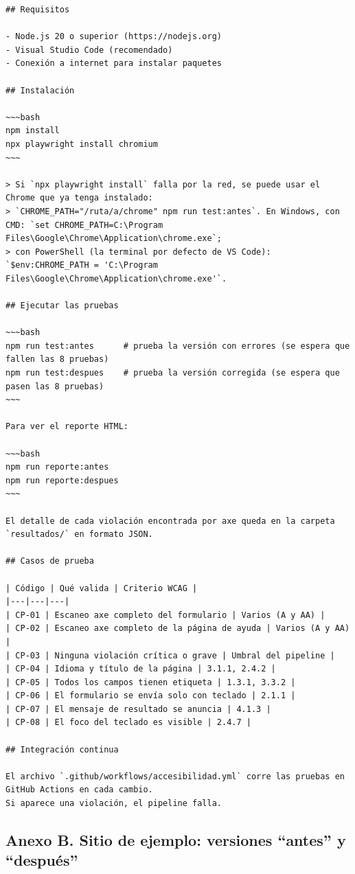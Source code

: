 \documentclass[10pt,letterpaper,onecolumn]{IEEEtran}
\begin{document}
\begin{lstlisting}
## Requisitos

- Node.js 20 o superior (https://nodejs.org)
- Visual Studio Code (recomendado)
- Conexión a internet para instalar paquetes

## Instalación

~~~bash
npm install
npx playwright install chromium
~~~

> Si `npx playwright install` falla por la red, se puede usar el Chrome que ya tenga instalado:
> `CHROME_PATH="/ruta/a/chrome" npm run test:antes`. En Windows, con CMD: `set CHROME_PATH=C:\Program Files\Google\Chrome\Application\chrome.exe`;
> con PowerShell (la terminal por defecto de VS Code): `$env:CHROME_PATH = 'C:\Program Files\Google\Chrome\Application\chrome.exe'`.

## Ejecutar las pruebas

~~~bash
npm run test:antes      # prueba la versión con errores (se espera que fallen las 8 pruebas)
npm run test:despues    # prueba la versión corregida (se espera que pasen las 8 pruebas)
~~~

Para ver el reporte HTML:

~~~bash
npm run reporte:antes
npm run reporte:despues
~~~

El detalle de cada violación encontrada por axe queda en la carpeta `resultados/` en formato JSON.

## Casos de prueba

| Código | Qué valida | Criterio WCAG |
|---|---|---|
| CP-01 | Escaneo axe completo del formulario | Varios (A y AA) |
| CP-02 | Escaneo axe completo de la página de ayuda | Varios (A y AA) |
| CP-03 | Ninguna violación crítica o grave | Umbral del pipeline |
| CP-04 | Idioma y título de la página | 3.1.1, 2.4.2 |
| CP-05 | Todos los campos tienen etiqueta | 1.3.1, 3.3.2 |
| CP-06 | El formulario se envía solo con teclado | 2.1.1 |
| CP-07 | El mensaje de resultado se anuncia | 4.1.3 |
| CP-08 | El foco del teclado es visible | 2.4.7 |

## Integración continua

El archivo `.github/workflows/accesibilidad.yml` corre las pruebas en GitHub Actions en cada cambio.
Si aparece una violación, el pipeline falla.
\end{lstlisting}

\subsection{Anexo B. Sitio de ejemplo: versiones ``antes'' y ``después''}\label{anexo-b.-sitio-de-ejemplo-versiones-antes-y-despuuxe9s}
\end{document}
